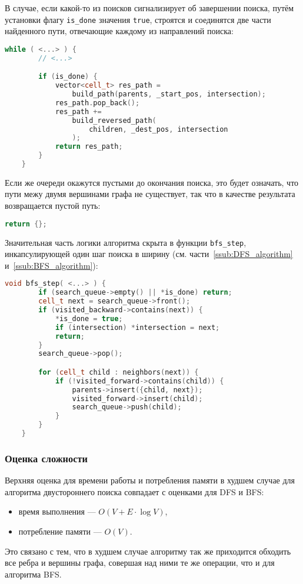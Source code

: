 \documentclass[a4paper, 12pt]{article}
\begin{document}
В случае, если какой-то из поисков сигнализирует об завершении поиска, путём установки флагу \verb|is_done| значения \verb|true|, строятся и соединятся две части найденного пути, отвечающие каждому из направлений поиска:
\begin{lstlisting}[language=C++]
    while ( <...> ) {
        // <...>

        if (is_done) {
            vector<cell_t> res_path =
                build_path(parents, _start_pos, intersection);
            res_path.pop_back();
            res_path +=
                build_reversed_path(
                    children, _dest_pos, intersection
                );
            return res_path;
        }
    }
\end{lstlisting}

Если же очереди окажутся пустыми до окончания поиска, это будет означать, что пути межу двумя вершинами графа не существует, так что в качестве результата возвращается пустой путь:
\begin{lstlisting}[language=C++]
    return {};
\end{lstlisting}

Значительная часть логики алгоритма скрыта в функции \verb|bfs_step|, инкапсулирующей один шаг поиска в ширину (см. части~\ref{ssub:DFS_algorithm} и~\ref{ssub:BFS_algorithm}):
\begin{lstlisting}[language=C++]
    void bfs_step( <...> ) {
        if (search_queue->empty() || *is_done) return;
        cell_t next = search_queue->front();
        if (visited_backward->contains(next)) {
            *is_done = true;
            if (intersection) *intersection = next;
            return;
        }
        search_queue->pop();

        for (cell_t child : neighbors(next)) {
            if (!visited_forward->contains(child)) {
                parents->insert({child, next});
                visited_forward->insert(child);
                search_queue->push(child);
            }
        }
    }
\end{lstlisting}

\subsubsection{Оценка сложности}
\label{ssub:bi_BFS_complexity}
Верхняя оценка для времени работы и потребления памяти в худшем случае для алгоритма двустороннего поиска совпадает с оценками для DFS и BFS:
\begin{itemize}
    \item время выполнения --- \({ O(V + E \cdot \log V) }\),
    \item потребление памяти --- \({ O(V) }\).
\end{itemize}
Это связано с тем, что в худшем случае алгоритму так же приходится обходить все ребра и вершины графа, совершая над ними те же операции, что и для алгоритма BFS.
\end{document}
